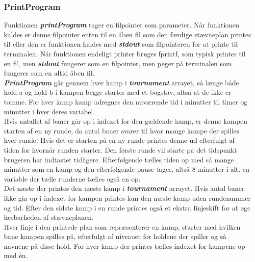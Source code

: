 \subsubsection{PrintProgram}
Funktionen \textbf{\textit{printProgram}} tager en filpointer som parameter. Når funktionen kaldes er denne filpointer enten til en åben fil som den færdige stævneplan printes til eller den er funktionen kaldes med \textbf{\textit{stdout}} som filpointeren for at printe til terminalen. Når funktionen endeligt printer bruges fprintf, som typisk printer til en fil, men \textbf{\textit{stdout}} fungerer som en filpointer, men peger på terminalen som fungerer som en altid åben fil. \\
\textbf{\textit{PrintProgram}} går gennem hver kamp i \textbf{\textit{tournament}} arrayet, så længe både hold a og hold b i kampen begge starter med et bogstav, altså at de ikke er tomme. For hver kamp kamp udregnes den nuværende tid i minutter til timer og minutter i hver deres variabel.\\
 Hvis antallet af baner går op i indexet for den gældende kamp, er denne kampen starten af en ny runde, da antal baner svarer til hvor mange kampe der spilles hver runde. Hvis det er starten på en ny runde printes denne ud efterfulgt af tiden for hvornår runden starter. Den første runde vil starte på det tidspunkt brugeren har indtastet tidligere. Efterfølgende tælles tiden op med så mange minutter som en kamp og den efterfølgende pause tager, altså 8 minutter i alt. en variable der tælle runderne tælles også en op. \\
 Det næste der printes den næste kamp i \textbf{\textit{tournament}} arrayet. Hvis antal baner ikke går op i indexet for kampen printes kun den næste kamp uden rundenummer og tid. Efter den sidste kamp i en runde printes også et ekstra linjeskift for at øge læsbarheden af stævneplanen. \\
 Hver linje i den printede plan som repræsenterer en kamp, starter med hvilken bane kampen spilles på, efterfulgt af niveauet for holdene der spiller og så navnene på disse hold. For hver kamp der printes tælles indexet for kampene op med én. \\
 
